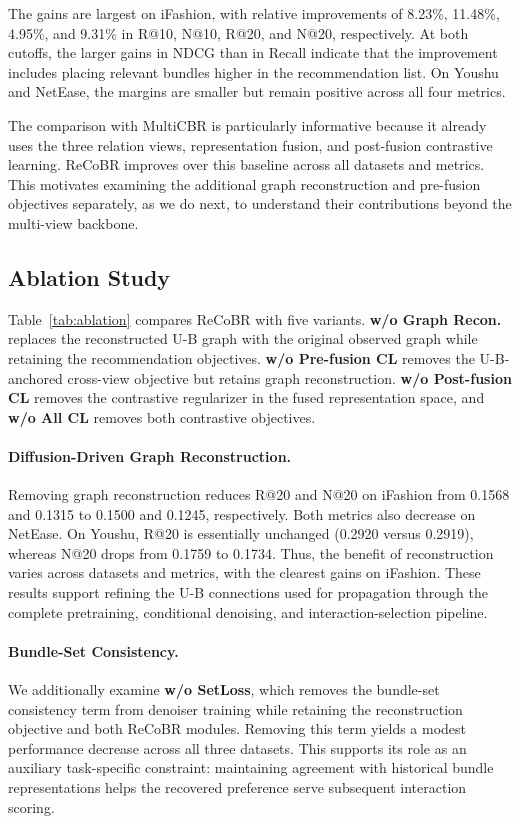 \documentclass[letterpaper]{article}
\begin{document}
The gains are largest on iFashion, with relative improvements
of 8.23\%, 11.48\%, 4.95\%, and 9.31\% in R@10, N@10, R@20,
and N@20, respectively. At both cutoffs, the larger gains in
NDCG than in Recall indicate that the improvement includes
placing relevant bundles higher in the recommendation list.
On Youshu and NetEase, the margins are smaller but remain
positive across all four metrics.

The comparison with MultiCBR is particularly informative
because it already uses the three relation views, representation
fusion, and post-fusion contrastive learning. ReCoBR improves
over this baseline across all datasets and metrics. This
motivates examining the additional graph reconstruction and
pre-fusion objectives separately, as we do next, to understand
their contributions beyond the multi-view backbone.


\subsection{Ablation Study}

Table~\ref{tab:ablation} compares ReCoBR with five variants.
\textbf{w/o Graph Recon.} replaces the reconstructed U-B graph
with the original observed graph while retaining the
recommendation objectives. \textbf{w/o Pre-fusion CL} removes
the U-B-anchored cross-view objective but retains graph
reconstruction. \textbf{w/o Post-fusion CL} removes the
contrastive regularizer in the fused representation space,
and \textbf{w/o All CL} removes both contrastive objectives.

\paragraph{Diffusion-Driven Graph Reconstruction.}
Removing graph reconstruction reduces R@20 and N@20 on iFashion
from 0.1568 and 0.1315 to 0.1500 and 0.1245, respectively.
Both metrics also decrease on NetEase. On Youshu, R@20 is
essentially unchanged (0.2920 versus 0.2919), whereas N@20
drops from 0.1759 to 0.1734. Thus, the benefit of reconstruction
varies across datasets and metrics, with the clearest gains on
iFashion. These results support refining the U-B connections
used for propagation through the complete pretraining,
conditional denoising, and interaction-selection pipeline.

\paragraph{Bundle-Set Consistency.}
We additionally examine \textbf{w/o SetLoss}, which removes
the bundle-set consistency term from denoiser training while
retaining the reconstruction objective and both ReCoBR modules.
Removing this term yields a modest performance decrease
across all three datasets. This supports its role as an
auxiliary task-specific constraint: maintaining agreement
with historical bundle representations helps the recovered
preference serve subsequent interaction scoring.
\end{document}
